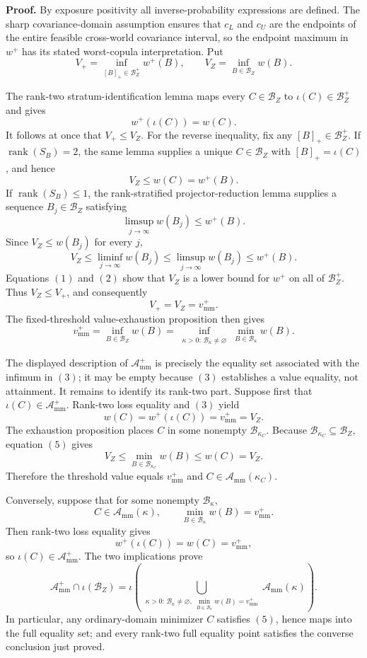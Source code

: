\textbf{Proof.}
By exposure positivity all inverse-probability expressions are defined.  The sharp covariance-domain assumption ensures that \(c_L\) and \(c_U\) are the endpoints of the entire feasible cross-world covariance interval, so the endpoint maximum in \(w^+\) has its stated worst-copula interpretation.  Put
\[
 V_+=\inf_{[B]_+\in\mathcal B_Z^+}w^+(B),
 \qquad
 V_Z=\inf_{B\in\mathcal B_Z}w(B).
\]

The rank-two stratum-identification lemma maps every \(C\in\mathcal B_Z\) to \(\iota(C)\in\mathcal B_Z^+\) and gives
\[
 w^+(\iota(C))=w(C).
\]
It follows at once that \(V_+\le V_Z\).  For the reverse inequality, fix any \([B]_+\in\mathcal B_Z^+\).  If \(\operatorname{rank}(S_B)=2\), the same lemma supplies a unique \(C\in\mathcal B_Z\) with \([B]_+=\iota(C)\), and hence
\[
 V_Z\le w(C)=w^+(B).
\tag{1}
\]
If \(\operatorname{rank}(S_B)\le1\), the rank-stratified projector-reduction lemma supplies a sequence \(B_j\in\mathcal B_Z\) satisfying
\[
 \limsup_{j\to\infty}w(B_j)\le w^+(B).
\]
Since \(V_Z\le w(B_j)\) for every \(j\),
\[
 V_Z
 \le\liminf_{j\to\infty}w(B_j)
 \le\limsup_{j\to\infty}w(B_j)
 \le w^+(B).
\tag{2}
\]
Equations \((1)\) and \((2)\) show that \(V_Z\) is a lower bound for \(w^+\) on all of \(\mathcal B_Z^+\).  Thus \(V_Z\le V_+\), and consequently
\[
 V_+=V_Z=v_{\mathrm{mm}}^+.
\tag{3}
\]
The fixed-threshold value-exhaustion proposition then gives
\[
 v_{\mathrm{mm}}^+
 =\inf_{B\in\mathcal B_Z}w(B)
 =\inf_{\substack{\kappa>0:\,\mathcal B_\kappa\ne\varnothing}}
 \min_{B\in\mathcal B_\kappa}w(B).
\tag{4}
\]

The displayed description of \(\mathcal A_{\mathrm{mm}}^+\) is precisely the equality set associated with the infimum in \((3)\); it may be empty because \((3)\) establishes a value equality, not attainment.  It remains to identify its rank-two part.  Suppose first that \(\iota(C)\in\mathcal A_{\mathrm{mm}}^+\).  Rank-two loss equality and \((3)\) yield
\[
 w(C)=w^+(\iota(C))=v_{\mathrm{mm}}^+=V_Z.
\tag{5}
\]
The exhaustion proposition places \(C\) in some nonempty \(\mathcal B_{\kappa_C}\).  Because \(\mathcal B_{\kappa_C}\subseteq\mathcal B_Z\), equation \((5)\) gives
\[
 V_Z
 \le\min_{B\in\mathcal B_{\kappa_C}}w(B)
 \le w(C)
 =V_Z.
\]
Therefore the threshold value equals \(v_{\mathrm{mm}}^+\) and \(C\in\mathcal A_{\mathrm{mm}}(\kappa_C)\).

Conversely, suppose that for some nonempty \(\mathcal B_\kappa\),
\[
 C\in\mathcal A_{\mathrm{mm}}(\kappa),
 \qquad
 \min_{B\in\mathcal B_\kappa}w(B)=v_{\mathrm{mm}}^+.
\]
Then rank-two loss equality gives
\[
 w^+(\iota(C))=w(C)=v_{\mathrm{mm}}^+,
\]
so \(\iota(C)\in\mathcal A_{\mathrm{mm}}^+\).  The two implications prove
\[
\mathcal A_{\mathrm{mm}}^+\cap\iota(\mathcal B_Z)
=\iota\!\left(
\bigcup_{\substack{\kappa>0:\,
\mathcal B_\kappa\ne\varnothing,\ 
\min_{B\in\mathcal B_\kappa}w(B)=v_{\mathrm{mm}}^+}}
\mathcal A_{\mathrm{mm}}(\kappa)\right).
\tag{6}
\]
In particular, any ordinary-domain minimizer \(C\) satisfies \((5)\), hence maps into the full equality set; and every rank-two full equality point satisfies the converse conclusion just proved.

